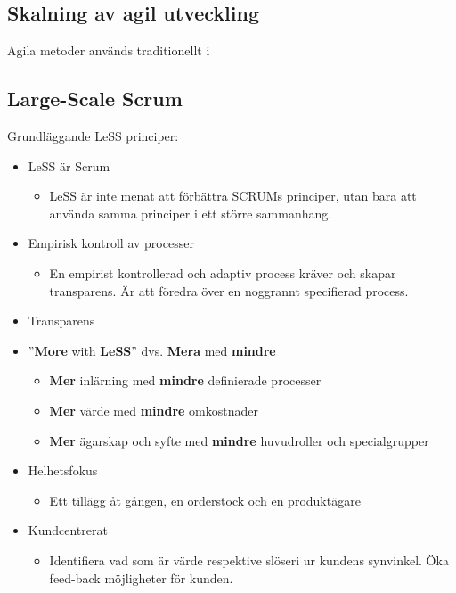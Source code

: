 	\subsection{Skalning av agil utveckling}
	Agila metoder används traditionellt i 
	
	
	\subsection{Large-Scale Scrum}
	
	
	Grundläggande LeSS principer: \cite{less_principles}
	
	\begin{itemize}
		\setlength{\itemsep}{1pt}
		\item LeSS är Scrum
			\begin{itemize}
				\item LeSS är inte menat att förbättra SCRUMs principer, utan bara att använda samma principer i ett större sammanhang.
			\end{itemize}
		\item Empirisk kontroll av processer
			\begin{itemize}
				\item En empirist kontrollerad och adaptiv process kräver och skapar transparens. Är att föredra över en noggrannt specifierad process.
			\end{itemize}
		\item Transparens
		\item ''\textbf{More} with \textbf{LeSS}'' dvs. \textbf{Mera} med \textbf{mindre}
			\begin{itemize}
				\item \textbf{Mer} inlärning med \textbf{mindre} definierade processer
				\item \textbf{Mer} värde med \textbf{mindre} omkostnader
				\item \textbf{Mer} ägarskap och syfte med \textbf{mindre} huvudroller och specialgrupper
			\end{itemize}
		\item Helhetsfokus
			\begin{itemize}
				\item Ett tillägg åt gången, en orderstock och en produktägare
			\end{itemize}
		\item Kundcentrerat
			\begin{itemize}
				\item Identifiera vad som är värde respektive slöseri ur kundens synvinkel. Öka feed-back möjligheter för kunden.

\end{itemize}
\end{itemize}
